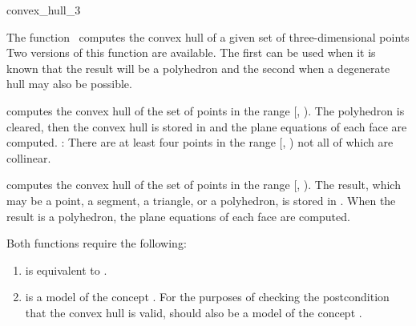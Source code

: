 \begin{ccRefFunction}{convex_hull_3}

\ccDefinition

The function \ccRefName\ computes the convex hull of a given set of 
three-dimensional points 
Two versions of this function 
are available.  The first can be used when it is known that the result
will be a polyhedron and the second when a degenerate hull
may also be possible.


{
computes the convex hull of the set of points in the range
[, ).  The polyhedron  is cleared, then
the convex hull is stored in  
and the plane equations of each face are computed.
\ccPrecond: There are at least four points in the range 
[, ) not all of which are collinear.
}

{
computes the convex hull of the set of points in the range
[, ).  The result, which may be a point, a segment,
a triangle, or a polyhedron, is stored in .  When
the result is a polyhedron, the plane equations of each face are computed.
}

Both functions require the following:
\begin{enumerate}
   \item {} is equivalent to .
   \item {} is a model of the concept 
         .  
         For the purposes of checking the postcondition that the convex hull
         is valid,  should also be a model of the concept
         .
\end{enumerate}


\end{ccRefFunction}
